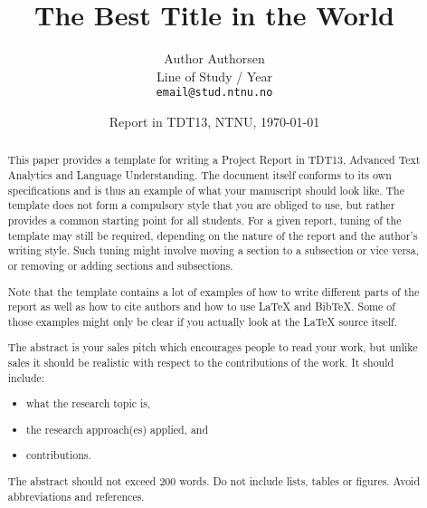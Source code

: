 \documentclass[11pt]{article}
\title{The Best Title in the World}
\author{Author Authorsen \\
  Line of Study / Year \\
  {\tt email@stud.ntnu.no} \\}
\date{Report in TDT13, NTNU, \today}
\begin{document}
\maketitle
\begin{abstract}
This paper provides a template for writing a Project Report in TDT13, Advanced Text Analytics and Language Understanding. 
The document itself conforms to its own specifications and is thus an example of what your manuscript should look like. 
The template does not form a compulsory style that you are obliged to use, but rather provides a common starting point for all students. 
For a given report, tuning of the template may still be required, depending on the nature of the report and the author's writing style. 
Such tuning might involve moving a section to a subsection or vice versa, or removing or adding sections and subsections.

Note that the template contains a lot of examples of how to write different parts of the report 
as well as how to cite authors and how to use LaTeX and BibTeX. 
Some of those examples might only be clear if you actually look at the LaTeX source itself.

The abstract is your sales pitch which encourages people to read your work, 
but unlike sales it should be realistic with respect to the contributions of the work. 
It should include:
\begin{itemize}
\item what the research topic is, 
\item the research approach(es) applied, and 
\item contributions.
\end{itemize}

The abstract should not exceed 200 words. 
Do not include lists, tables or figures.
Avoid abbreviations and references.  
\end{abstract}












%
\end{document}
